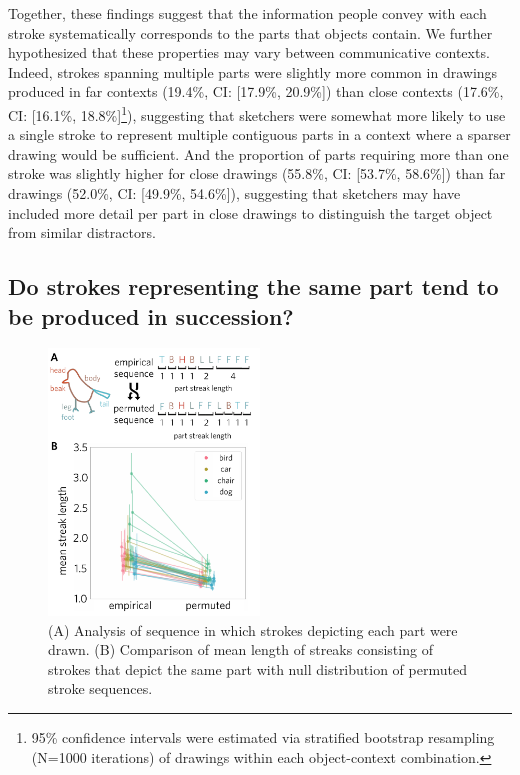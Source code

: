 \documentclass[10pt,letterpaper]{article}
\begin{document}
Together, these findings suggest that the information people convey with each stroke systematically corresponds to the parts that objects contain. 
We further hypothesized that these properties may vary between communicative contexts.
Indeed, strokes spanning multiple parts were slightly more common in drawings produced in far contexts (19.4\%, CI: [17.9\%, 20.9\%]) than close contexts (17.6\%, CI: [16.1\%, 18.8\%]\footnote{95\% confidence intervals were estimated via stratified bootstrap resampling (N=1000 iterations) of drawings within each object-context combination.}), suggesting that sketchers were somewhat more likely to use a single stroke to represent multiple contiguous parts in a context where a sparser drawing would be sufficient.
And the proportion of parts requiring more than one stroke was slightly higher for close drawings (55.8\%, CI: [53.7\%, 58.6\%]) than far drawings (52.0\%, CI: [49.9\%, 54.6\%]), suggesting that sketchers may have included more detail per part in close drawings to distinguish the target object from similar distractors. 


\subsection{Do strokes representing the same part tend to be produced in succession?}
\begin{figure}[t]
\centering
\includegraphics[width=0.5\textwidth]{figures/6_part_sequence.pdf}
\caption{(A) Analysis of sequence in which strokes depicting each part were drawn. (B) Comparison of mean length of streaks consisting of strokes that depict the same part with null distribution of permuted stroke sequences.}
\label{stroke_sequence_fig}
\end{figure}
\end{document}
